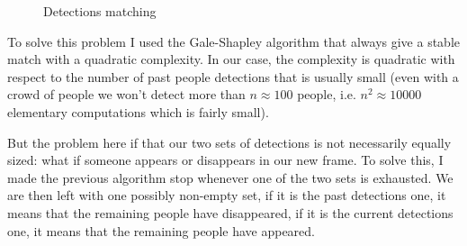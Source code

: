 \documentclass[a4paper, twocolumn]{article}
\newcommand{\changeSize}[1]{\fontsize{#1pt}{7.2}\selectfont}
\newcommand{\tinySize}{\changeSize{8}}
\begin{document}
\begin{figure}
        \caption{Detections matching}
        \label{pred_match}
    \end{figure}

    To solve this problem I used the Gale-Shapley algorithm \cite{10.2307/2312726} that always give a stable match with a quadratic complexity. In our case, the complexity is quadratic with respect to the number of past people detections that is usually small (even with a crowd of people we won't detect more than $n \approx 100$ people, i.e. $n^2 \approx 10 000$ elementary computations which is fairly small).

    But the problem here if that our two sets of detections is not necessarily equally sized: what if someone appears or disappears in our new frame. To solve this, I made the previous algorithm stop whenever one of the two sets is exhausted. We are then left with one possibly non-empty set, if it is the past detections one, it means that the remaining people have disappeared, if it is the current detections one, it means that the remaining people have appeared.
\end{document}
